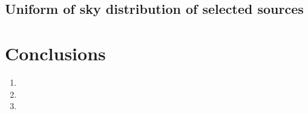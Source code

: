 \documentclass{aa}
\begin{document}
\subsection{Uniform of sky distribution of selected sources}


\section{Conclusions}

   \begin{enumerate}
      \item 
      \item 
      \item 
   \end{enumerate}

\begin{acknowledgements}
      
\end{acknowledgements}


%

\end{document}
